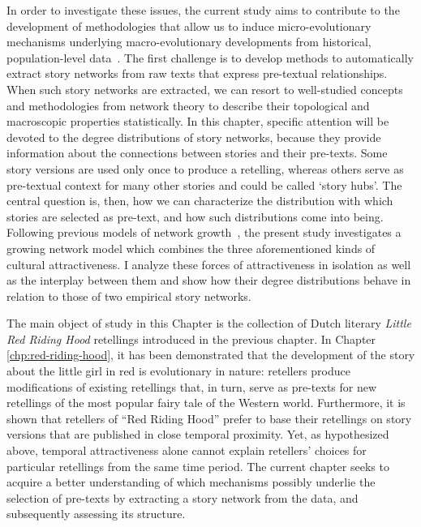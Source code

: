 In order to investigate these issues, the current study aims to contribute to the development of methodologies that allow us to induce micro-evolutionary mechanisms underlying macro-evolutionary developments from historical, population-level data~\autocite{Mesoudi:2009, kandler:2013, beheim:2014, Acerbi:2014, isaksson:2015}. The first challenge is to develop methods to automatically extract story networks from raw texts that express pre-textual relationships. When such story networks are extracted, we can resort to well-studied concepts and methodologies from network theory to describe their topological and macroscopic properties statistically\autocite{newman:2003}. In this chapter, specific attention will be devoted to the degree distributions of story networks, because they provide information about the connections between stories and their pre-texts. Some story versions are used only once to produce a retelling, whereas others serve as pre-textual context for many other stories and could be called `story hubs'. The central question is, then, how we can characterize the distribution with which stories are selected as pre-text, and how such distributions come into being. Following previous models of network growth~\autocite{price:1976,dorogovtsev:2000,barabasi:1999,eom:2011}, the present study investigates a growing network model which combines the three aforementioned kinds of cultural attractiveness. I analyze these forces of attractiveness in isolation as well as the interplay between them and show how their degree distributions behave in relation to those of two empirical story networks.

The main object of study in this Chapter is the collection of Dutch literary \emph{Little Red Riding Hood} retellings introduced in the previous chapter. In Chapter \ref{chp:red-riding-hood}, it has been demonstrated that the development of the story about the little girl in red is evolutionary in nature: retellers produce modifications of existing retellings that, in turn, serve as pre-texts for new retellings of the most popular fairy tale of the Western world. Furthermore, it is shown that retellers of ``Red Riding Hood'' prefer to base their retellings on story versions that are published in close temporal proximity. Yet, as hypothesized above, temporal attractiveness alone cannot explain retellers' choices for particular retellings from the same time period. The current chapter seeks to acquire a better understanding of which mechanisms possibly underlie the selection of pre-texts by extracting a story network from the data, and subsequently assessing its structure. 

